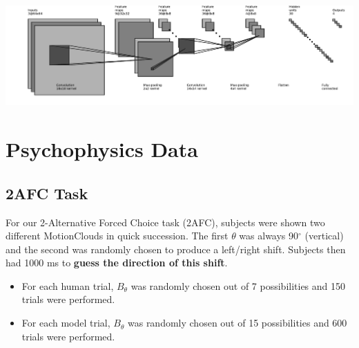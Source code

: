 \documentclass[a0,portrait]{a0poster}
\begin{document}
\begin{multicols}{3}
\includegraphics[width=1\linewidth]{CNN.pdf}

\section*{Psychophysics Data}
\subsection*{2AFC Task}
For our 2-Alternative Forced Choice task (2AFC), subjects were shown two different MotionClouds in quick succession. The first $\theta$ was always 90$^\circ$ (vertical) and the second was randomly chosen to produce a left/right shift. Subjects then had 1000 ms to \textbf{guess the direction of this shift}.
\begin{itemize}
\item For each human trial, $B_\theta$ was randomly chosen out of 7 possibilities and 150 trials were performed.
\item For each model trial, $B_\theta$ was randomly chosen out of 15 possibilities and 600 trials were performed.
\end{itemize}


\end{multicols}
\end{document}
